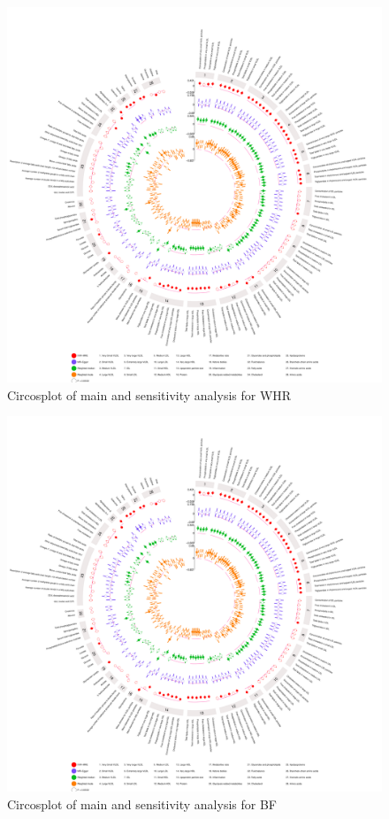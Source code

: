 \documentclass[11pt,twoside]{bristolthesis}
\begin{document}
\begin{figure}
\includegraphics[width=1\linewidth]{data/chapter5/figures/sensitivity_analysis_WHR} \caption{Circosplot of main and sensitivity analysis for WHR}\label{fig:appendix-chapter5-figure-circosplot-sensitivity-main-WHR}
\end{figure}
\begin{figure}
\includegraphics[width=1\linewidth]{data/chapter5/figures/sensitivity_analysis_WHR} \caption{Circosplot of main and sensitivity analysis for BF}\label{fig:appendix-chapter5-figure-circosplot-sensitivity-main-BF}
\end{figure}
\end{document}
